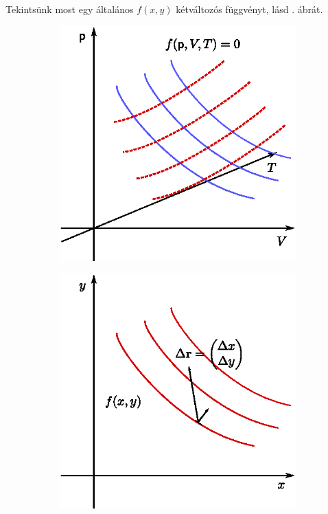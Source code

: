 Tekintsünk most egy általános $f(x,y)$ kétváltozós függvényt, lásd . ábrát.
\begin{figure}[htb]
    \centering
    \begin{subfigure}[]{0.45\textwidth}
            \centering
            \includegraphics[width=\textwidth]{termo_2/termo_2_5}
            \label{fig:termo_2_5}
    \end{subfigure}\hfill
    \begin{subfigure}[]{0.45\textwidth}
            \centering
            \includegraphics[width=\textwidth]{termo_2/termo_2_6}
            \label{fig:termo_2_6}
    \end{subfigure}
\end{figure}
